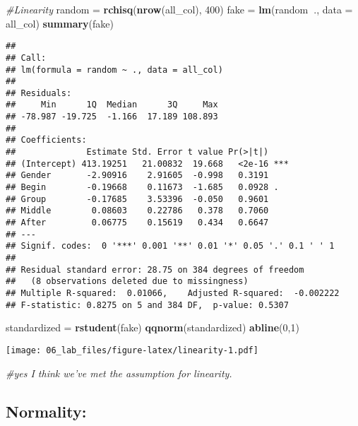 \documentclass[
]{article}
\newenvironment{Shaded}{\begin{snugshade}}{\end{snugshade}}
\newcommand{\CommentTok}[1]{\textcolor[rgb]{0.56,0.35,0.01}{\textit{#1}}}
\newcommand{\DataTypeTok}[1]{\textcolor[rgb]{0.13,0.29,0.53}{#1}}
\newcommand{\DecValTok}[1]{\textcolor[rgb]{0.00,0.00,0.81}{#1}}
\newcommand{\KeywordTok}[1]{\textcolor[rgb]{0.13,0.29,0.53}{\textbf{#1}}}
\newcommand{\NormalTok}[1]{#1}
\newcommand{\OperatorTok}[1]{\textcolor[rgb]{0.81,0.36,0.00}{\textbf{#1}}}
\newcommand{\StringTok}[1]{\textcolor[rgb]{0.31,0.60,0.02}{#1}}
\begin{document}
\begin{Shaded}
\begin{Highlighting}[]
\CommentTok{#Linearity}
\NormalTok{random =}\StringTok{ }\KeywordTok{rchisq}\NormalTok{(}\KeywordTok{nrow}\NormalTok{(all_col), }\DecValTok{400}\NormalTok{)}
\NormalTok{fake =}\StringTok{ }\KeywordTok{lm}\NormalTok{(random}\OperatorTok{~}\NormalTok{., }\DataTypeTok{data =}\NormalTok{ all_col)}
\KeywordTok{summary}\NormalTok{(fake)}
\end{Highlighting}
\end{Shaded}

\begin{verbatim}
## 
## Call:
## lm(formula = random ~ ., data = all_col)
## 
## Residuals:
##     Min      1Q  Median      3Q     Max 
## -78.987 -19.725  -1.166  17.189 108.893 
## 
## Coefficients:
##              Estimate Std. Error t value Pr(>|t|)    
## (Intercept) 413.19251   21.00832  19.668   <2e-16 ***
## Gender       -2.90916    2.91605  -0.998   0.3191    
## Begin        -0.19668    0.11673  -1.685   0.0928 .  
## Group        -0.17685    3.53396  -0.050   0.9601    
## Middle        0.08603    0.22786   0.378   0.7060    
## After         0.06775    0.15619   0.434   0.6647    
## ---
## Signif. codes:  0 '***' 0.001 '**' 0.01 '*' 0.05 '.' 0.1 ' ' 1
## 
## Residual standard error: 28.75 on 384 degrees of freedom
##   (8 observations deleted due to missingness)
## Multiple R-squared:  0.01066,    Adjusted R-squared:  -0.002222 
## F-statistic: 0.8275 on 5 and 384 DF,  p-value: 0.5307
\end{verbatim}

\begin{Shaded}
\begin{Highlighting}[]
\NormalTok{standardized =}\StringTok{ }\KeywordTok{rstudent}\NormalTok{(fake)}
\KeywordTok{qqnorm}\NormalTok{(standardized)}
\KeywordTok{abline}\NormalTok{(}\DecValTok{0}\NormalTok{,}\DecValTok{1}\NormalTok{)}
\end{Highlighting}
\end{Shaded}

\texttt{[image: 06\_lab\_files/figure-latex/linearity-1.pdf]}

\begin{Shaded}
\begin{Highlighting}[]
\CommentTok{#yes I think we've met the assumption for linearity.}
\end{Highlighting}
\end{Shaded}

\hypertarget{normality}{%
\subsection{Normality:}\label{normality}}
\end{document}
